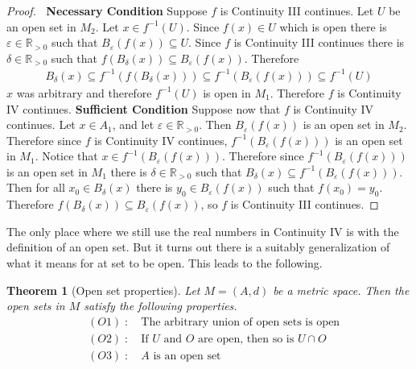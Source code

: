 \documentclass{article}
\theoremstyle{plain}
\newtheorem{theorem}{Theorem}
\theoremstyle{definition}
\newcommand{\R}{\mathbb{R}}
\begin{document}
\begin{proof}$\ $\newline
	\textbf{Necessary Condition}\newline
	Suppose $f$ is Continuity III continues. Let $U$ be an open
	set in $M_2$.  Let $x\in f^{-1}(U)$. Since $f(x)\in U$
	which is open there is $\varepsilon\in\R_{>0}$ such that
	$B_{\varepsilon}(f(x))\subseteq U$. Since $f$ is Continuity
	III continues there is $\delta\in\R_{>0}$ such that
	$f(B_{\delta}(x))\subseteq B_{\varepsilon}(f(x))$. Therefore
	\begin{equation}
	\begin{aligned}
		B_{\delta}(x)\subseteq f^{-1}(f(B_{\delta}(x))) \subseteq 
		f^{-1}(B_{\varepsilon}(f(x)))\subseteq f^{-1}(U)
	\end{aligned}
	\end{equation}
	$x$ was arbitrary and therefore $f^{-1}(U)$ is open in
	$M_1$. Therefore $f$ is Continuity IV continues.
	\newline\newline
	\textbf{Sufficient Condition}\newline
	Suppose now that $f$ is Continuity IV continues. Let $x\in A_1$, and let
	$\varepsilon\in\R_{>0}$. Then $B_{\varepsilon}(f(x))$ is an open set in
	$M_2$. Therefore since $f$ is Continuity IV continues,
	$f^{-1}(B_{\varepsilon}(f(x)))$ is an open set in $M_1$. Notice that
	$x\in f^{-1}(B_{\varepsilon}(f(x)))$. Therefore since
	$f^{-1}(B_{\varepsilon}(f(x)))$ is an open set in $M_1$ there is
	$\delta\in\R_{>0}$ such that $B_{\delta}(x)\subseteq
	f^{-1}(B_{\varepsilon}(f(x)))$. Then for all $x_0\in B_{\delta}(x)$ there is
	$y_0\in B_{\varepsilon}(f(x))$ such that $f(x_0)=y_0$. Therefore
	$f(B_{\delta}(x))\subseteq B_{\varepsilon}(f(x))$, so $f$ is Continuity III
	continues.
\end{proof}
The only place where we still use the real numbers in Continuity IV is with the
definition of an open set. But it turns out there is a suitably generalization
of what it means for at set to be open. This leads to the following.
\begin{theorem}[Open set properties]\label{Openball is openset}
	Let $M=(A,d)$ be a metric space. Then the open sets in $M$
	satisfy the following properties. 
	\begin{equation}
	\begin{aligned}
		&(O1)\; :\quad \text{The arbitrary union of open sets is open}\\
		&(O2)\; :\quad \text{If $U$ and $O$ are open, then so is $U\cap O$}\\
		&(O3)\; :\quad \text{$A$ is an open set}\\
	\end{aligned}
	\end{equation}
\end{theorem}
\end{document}
